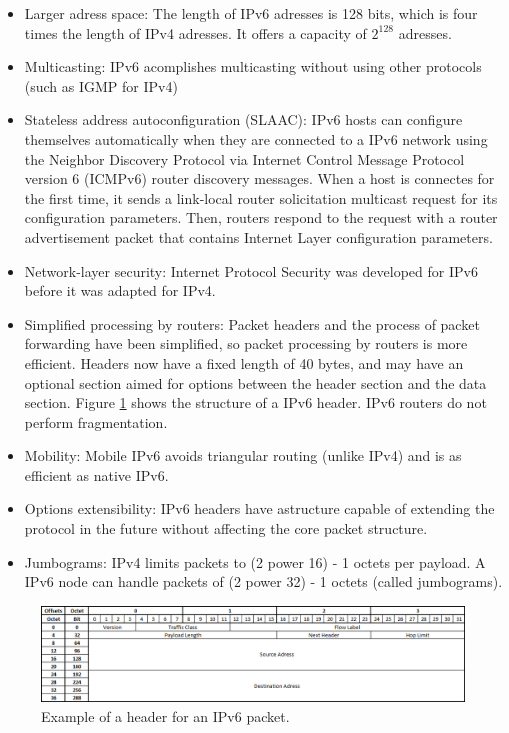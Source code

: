 \begin{itemize}
	\item Larger adress space: The length of IPv6 adresses is 128 bits, which is four times the length of IPv4 adresses. It offers a capacity of $2^{128}$ adresses.
	\item Multicasting: IPv6 acomplishes multicasting without using other protocols (such as IGMP for IPv4)
	\item Stateless address autoconfiguration (SLAAC): IPv6 hosts can configure themselves automatically when they are connected to a IPv6 network using the Neighbor Discovery Protocol via Internet Control Message Protocol version 6 (ICMPv6) router discovery messages. When a host is connectes for the first time, it sends a link-local router solicitation multicast request for its configuration parameters. Then, routers respond to the request with a router advertisement packet that contains Internet Layer configuration parameters.
	\item Network-layer security: Internet Protocol Security was developed for IPv6 before it was adapted for IPv4.
	\item Simplified processing by routers: Packet headers and the process of packet forwarding have been simplified, so packet processing by routers is more efficient. Headers now have a fixed length of 40 bytes, and may have an optional section aimed for options between the header section and the data section. Figure \ref{fig:IPv6header} shows the structure of a IPv6 header. IPv6 routers do not perform fragmentation.
	\item Mobility: Mobile IPv6 avoids triangular routing (unlike IPv4) and is as efficient as native IPv6.
	\item Options extensibility: IPv6 headers have astructure capable of extending the protocol in the future without affecting the core packet structure.
	\item Jumbograms: IPv4 limits packets to (2 power 16) - 1 octets per payload. A IPv6 node can handle packets of (2 power 32) - 1 octets (called jumbograms).
\end{itemize}

\begin{figure}[H]
\begin{center}
\includegraphics[scale=0.6]{IPv6_header.PNG}
\caption[IPv6 header]{Example of a header for an IPv6 packet.}
\label{fig:IPv6header}
\end{center}
\end{figure}

